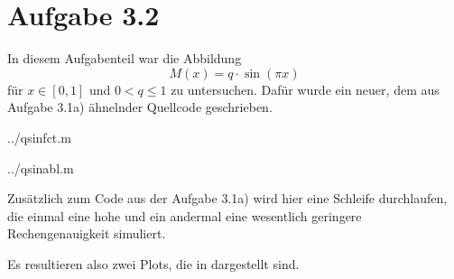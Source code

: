 \section*{Aufgabe 3.2}
In diesem Aufgabenteil war die Abbildung $$M(x) = q\cdot \sin(πx)$$ für $x\in
[0,1]$ und $0< q \le 1$ zu untersuchen. Dafür wurde ein neuer, dem aus
Aufgabe 3.1a) ähnelnder Quellcode geschrieben.



 {../qsinfct.m}

 {../qsinabl.m}

Zusätzlich zum Code aus der Aufgabe 3.1a) wird hier eine Schleife durchlaufen,
die einmal eine hohe und ein andermal eine wesentlich geringere
Rechengenauigkeit simuliert. 

Es resultieren also zwei Plots, die in  dargestellt sind.

\begin{figure}[htb]%
\begin{center}%
\label{fig:qsin}
\end{center}
\end{figure}
